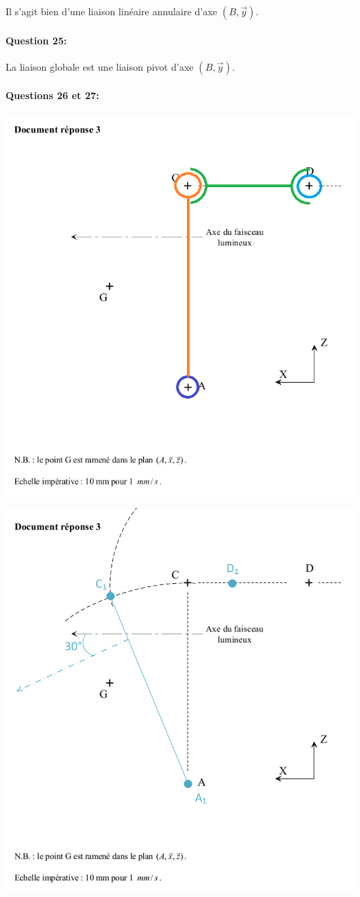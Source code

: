 Il s'agit bien d'une liaison linéaire annulaire d'axe $(B,\overrightarrow{y})$.

\paragraph{Question 25:}

La liaison globale est une liaison pivot d'axe $(B,\overrightarrow{y})$.

\paragraph{Questions 26 et 27:}

\begin{center}
  \includegraphics[width=0.6\linewidth]{img/rep141_cor}
\end{center}

\begin{center}
  \includegraphics[width=0.6\linewidth]{img/rep142_cor}
\end{center}

